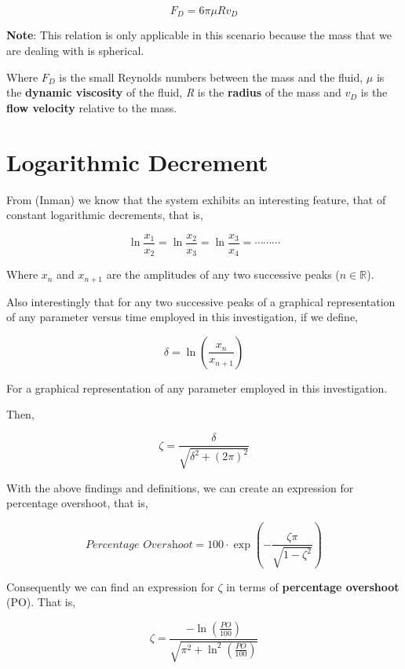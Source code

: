         $$F_D = 6\pi\mu Rv_D$$
            
    {\textbf{Note}: This relation is only applicable in this scenario because the mass that we are dealing with is spherical.}
            
    {Where $F_D$ is the small Reynolds numbers between the mass and the fluid, $\mu$ is the \textbf{dynamic viscosity} of the fluid, \textit{R} is the \textbf{radius} of the mass and $v_D$ is the \textbf{flow velocity} relative to the mass.}
            
\section{{Logarithmic Decrement}}
            
    {From (Inman) we know that the system exhibits an interesting feature, that of constant logarithmic decrements, that is,}
            
        $$\ln{\frac{x_1}{x_2}} = \ln{\frac{x_2}{x_3}} = \ln{\frac{x_3}{x_4}} = \cdots\cdots\cdots$$
            
    {Where $x_n$ and $x_{n + 1}$ are the amplitudes of any two successive peaks ($n \in \mathbb{R}$).}
            
    {Also interestingly that for any two successive peaks of a graphical representation of any parameter versus time employed in this investigation, if we define,}
            
        $$\delta = \ln{\left(\frac{x_n}{x_{n + 1}}\right)}$$
            
    {For a graphical representation of any parameter employed in this investigation.}
            
    {Then,}
            
        $$\zeta = \frac{\delta}{\sqrt{\delta^2 + \left(2\pi\right)^2}}$$
            
    {With the above findings and definitions, we can create an expression for percentage overshoot, that is,}
            
        $$\textit{Percentage Overshoot} = 100\cdot\exp{\left(-\frac{\zeta\pi}{\sqrt{1 - \zeta^2}}\right)}$$
            
    {Consequently we can find an expression for $\zeta$ in terms of \textbf{percentage overshoot} (PO). That is,}
            
        $$\zeta = \frac{-\ln{\left(\frac{PO}{100}\right)}}{\sqrt{\pi^2 + \ln^2{\left(\frac{PO}{100}\right)}}}$$
            
